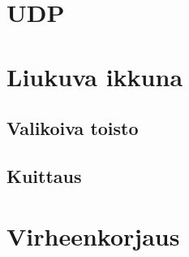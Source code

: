 \documentclass[a4paper,12pt]{article}
\begin{document}
    {
        \section{UDP}\label{sec:udp}
        \blindtext
    }

    {
        \section{Liukuva ikkuna}\label{sec:liukuva_ikkuna}
        \blindtext
    }
    {
        \subsection{Valikoiva toisto}\label{subsec:valikoiva_toisto}
        \blindtext
        \cite{greenwade93}
    }

    \subsection{Kuittaus}\label{subsec:kuittaus}
    \blindtext

    {
        \section{Virheenkorjaus}\label{sec:virheenkorjaus}
        \blindtext
        \cite{tietoliikenteenperusteet}
    }





    
    
\end{document}
